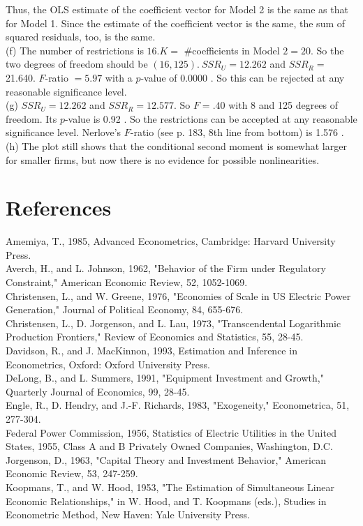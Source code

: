 \documentclass[10pt]{article}
\begin{document}
Thus, the OLS estimate of the coefficient vector for Model 2 is the same as that for Model 1. Since the estimate of the coefficient vector is the same, the sum of squared residuals, too, is the same.\\
(f) The number of restrictions is $16 . K=$ \#coefficients in Model $2=20$. So the two degrees of freedom should be $(16,125) . ~ S S R_{U}=12.262$ and $S S R_{R}=$ 21.640. $F$-ratio $=5.97$ with a $p$-value of 0.0000 . So this can be rejected at any reasonable significance level.\\
(g) $S S R_{U}=12.262$ and $S S R_{R}=12.577$. So $F=.40$ with 8 and 125 degrees of freedom. Its $p$-value is 0.92 . So the restrictions can be accepted at any reasonable significance level. Nerlove's $F$-ratio (see p. 183, 8th line from bottom) is 1.576 .\\
(h) The plot still shows that the conditional second moment is somewhat larger for smaller firms, but now there is no evidence for possible nonlinearities.

\section*{References}
Amemiya, T., 1985, Advanced Econometrics, Cambridge: Harvard University Press.\\
Averch, H., and L. Johnson, 1962, "Behavior of the Firm under Regulatory Constraint," American Economic Review, 52, 1052-1069.\\
Christensen, L., and W. Greene, 1976, "Economies of Scale in US Electric Power Generation," Journal of Political Economy, 84, 655-676.\\
Christensen, L., D. Jorgenson, and L. Lau, 1973, "Transcendental Logarithmic Production Frontiers," Review of Economics and Statistics, 55, 28-45.\\
Davidson, R., and J. MacKinnon, 1993, Estimation and Inference in Econometrics, Oxford: Oxford University Press.\\
DeLong, B., and L. Summers, 1991, "Equipment Investment and Growth," Quarterly Journal of Economics, 99, 28-45.\\
Engle, R., D. Hendry, and J.-F. Richards, 1983, "Exogeneity," Econometrica, 51, 277-304.\\
Federal Power Commission, 1956, Statistics of Electric Utilities in the United States, 1955, Class A and B Privately Owned Companies, Washington, D.C.\\
Jorgenson, D., 1963, "Capital Theory and Investment Behavior," American Economic Review, 53, 247-259.\\
Koopmans, T., and W. Hood, 1953, "The Estimation of Simultaneous Linear Economic Relationships," in W. Hood, and T. Koopmans (eds.), Studies in Econometric Method, New Haven: Yale University Press.
\end{document}
